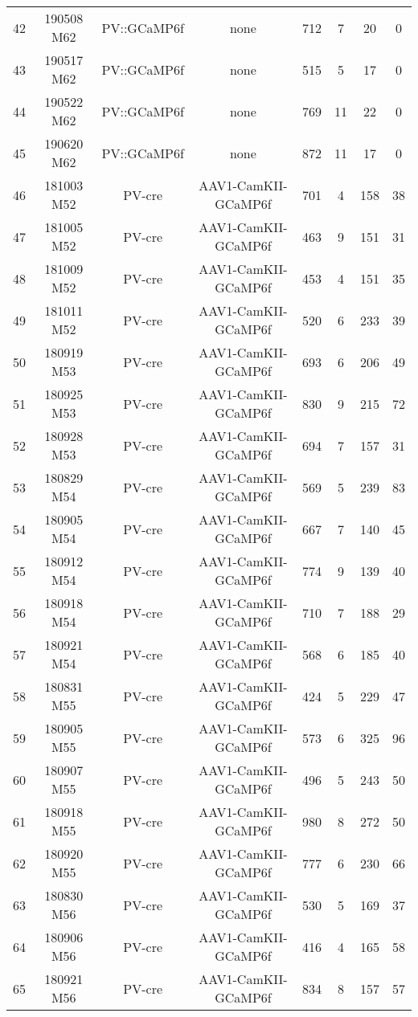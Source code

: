 \begin{table*}[htbp]
\begin{tabular}{lccccccc}
    42    & 190508 M62 & PV::GCaMP6f & none  & 712   & 7     & 20    & 0 \\
    43    & 190517 M62 & PV::GCaMP6f & none  & 515   & 5     & 17    & 0 \\
    44    & 190522 M62 & PV::GCaMP6f & none  & 769   & 11    & 22    & 0 \\
    45    & 190620 M62 & PV::GCaMP6f & none  & 872   & 11    & 17    & 0 \\
    46    & 181003 M52 & PV-cre & AAV1-CamKII-GCaMP6f & 701   & 4     & 158   & 38 \\
    47    & 181005 M52 & PV-cre & AAV1-CamKII-GCaMP6f & 463   & 9     & 151   & 31 \\
    48    & 181009 M52 & PV-cre & AAV1-CamKII-GCaMP6f & 453   & 4     & 151   & 35 \\
    49    & 181011 M52 & PV-cre & AAV1-CamKII-GCaMP6f & 520   & 6     & 233   & 39 \\
    50    & 180919 M53 & PV-cre & AAV1-CamKII-GCaMP6f & 693   & 6     & 206   & 49 \\
    51    & 180925 M53 & PV-cre & AAV1-CamKII-GCaMP6f & 830   & 9     & 215   & 72 \\
    52    & 180928 M53 & PV-cre & AAV1-CamKII-GCaMP6f & 694   & 7     & 157   & 31 \\
    53    & 180829 M54 & PV-cre & AAV1-CamKII-GCaMP6f & 569   & 5     & 239   & 83 \\
    54    & 180905 M54 & PV-cre & AAV1-CamKII-GCaMP6f & 667   & 7     & 140   & 45 \\
    55    & 180912 M54 & PV-cre & AAV1-CamKII-GCaMP6f & 774   & 9     & 139   & 40 \\
    56    & 180918 M54 & PV-cre & AAV1-CamKII-GCaMP6f & 710   & 7     & 188   & 29 \\
    57    & 180921 M54 & PV-cre & AAV1-CamKII-GCaMP6f & 568   & 6     & 185   & 40 \\
    58    & 180831 M55 & PV-cre & AAV1-CamKII-GCaMP6f & 424   & 5     & 229   & 47 \\
    59    & 180905 M55 & PV-cre & AAV1-CamKII-GCaMP6f & 573   & 6     & 325   & 96 \\
    60    & 180907 M55 & PV-cre & AAV1-CamKII-GCaMP6f & 496   & 5     & 243   & 50 \\
    61    & 180918 M55 & PV-cre & AAV1-CamKII-GCaMP6f & 980   & 8     & 272   & 50 \\
    62    & 180920 M55 & PV-cre & AAV1-CamKII-GCaMP6f & 777   & 6     & 230   & 66 \\
    63    & 180830 M56 & PV-cre & AAV1-CamKII-GCaMP6f & 530   & 5     & 169   & 37 \\
    64    & 180906 M56 & PV-cre & AAV1-CamKII-GCaMP6f & 416   & 4     & 165   & 58 \\
    65    & 180921 M56 & PV-cre & AAV1-CamKII-GCaMP6f & 834   & 8     & 157   & 57 \\
    \end{tabular}%
  \label{tab:expTable}%
\end{table*}%

